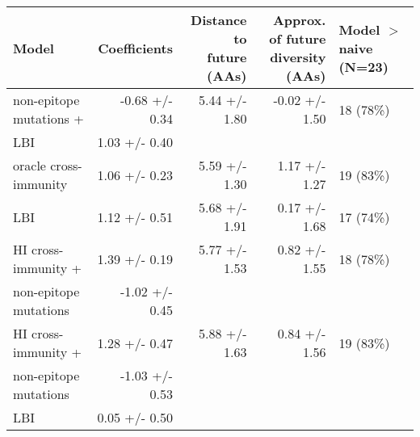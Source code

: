 \begin{tabular*}{1.0\textwidth}{lrrrl}
\toprule
                             Model &    Coefficients & \makecell{Distance to \\ future (AAs)} & \makecell{Approx. of future \\ diversity (AAs)} & \makecell[l]{Model $>$ naive \\ (N=23)} \\
\midrule
           non-epitope mutations + &  -0.68 +/- 0.34 &                          5.44 +/- 1.80 &                                  -0.02 +/- 1.50 &                               18 (78\%) \\
                   \hspace{3mm}LBI &   1.03 +/- 0.40 &                                        &                                                 &                                         \\
             oracle cross-immunity &   1.06 +/- 0.23 &                          5.59 +/- 1.30 &                                   1.17 +/- 1.27 &                               19 (83\%) \\
                               LBI &   1.12 +/- 0.51 &                          5.68 +/- 1.91 &                                   0.17 +/- 1.68 &                               17 (74\%) \\
               HI cross-immunity + &   1.39 +/- 0.19 &                          5.77 +/- 1.53 &                                   0.82 +/- 1.55 &                               18 (78\%) \\
 \hspace{3mm}non-epitope mutations &  -1.02 +/- 0.45 &                                        &                                                 &                                         \\
               HI cross-immunity + &   1.28 +/- 0.47 &                          5.88 +/- 1.63 &                                   0.84 +/- 1.56 &                               19 (83\%) \\
 \hspace{3mm}non-epitope mutations &  -1.03 +/- 0.53 &                                        &                                                 &                                         \\
                   \hspace{3mm}LBI &   0.05 +/- 0.50 &                                        &                                                 &                                         \\

\end{tabular*}

